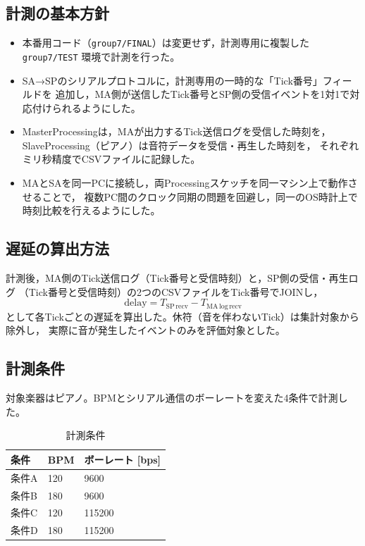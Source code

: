 \documentclass[11pt,a4paper]{ltjsarticle}
\begin{document}
\subsection{計測の基本方針}
\begin{itemize}
  \item 本番用コード（\texttt{group7/FINAL}）は変更せず，計測専用に複製した
        \texttt{group7/TEST} 環境で計測を行った。
  \item SA→SPのシリアルプロトコルに，計測専用の一時的な「Tick番号」フィールドを
        追加し，MA側が送信したTick番号とSP側の受信イベントを1対1で対応付けられるようにした。
  \item MasterProcessingは，MAが出力するTick送信ログを受信した時刻を，
        SlaveProcessing（ピアノ）は音符データを受信・再生した時刻を，
        それぞれミリ秒精度でCSVファイルに記録した。
  \item MAとSAを同一PCに接続し，両Processingスケッチを同一マシン上で動作させることで，
        複数PC間のクロック同期の問題を回避し，同一のOS時計上で時刻比較を行えるようにした。
\end{itemize}

\subsection{遅延の算出方法}
計測後，MA側のTick送信ログ（Tick番号と受信時刻）と，SP側の受信・再生ログ
（Tick番号と受信時刻）の2つのCSVファイルをTick番号でJOINし，
\[
  \mathrm{delay} = T_{\mathrm{SP\,recv}} - T_{\mathrm{MA\,log\,recv}}
\]
として各Tickごとの遅延を算出した。休符（音を伴わないTick）は集計対象から除外し，
実際に音が発生したイベントのみを評価対象とした。

\subsection{計測条件}
対象楽器はピアノ。BPMとシリアル通信のボーレートを変えた4条件で計測した。

\begin{table}[h]
\centering
\caption{計測条件}
\begin{tabular}{lll}
\toprule
条件 & BPM & ボーレート [bps] \\
\midrule
条件A & 120 & 9600 \\
条件B & 180 & 9600 \\
条件C & 120 & 115200 \\
条件D & 180 & 115200 \\
\bottomrule
\end{tabular}
\end{table}
\end{document}
